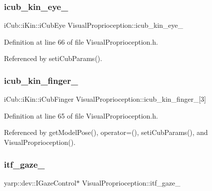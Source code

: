 \subsubsection{\texorpdfstring{icub\+\_\+kin\+\_\+eye\+\_\+}{icub\_kin\_eye\_}}
{\footnotesize\ttfamily i\+Cub\+::i\+Kin\+::i\+Cub\+Eye Visual\+Proprioception\+::icub\+\_\+kin\+\_\+eye\+\_\+\hspace{0.3cm}{\ttfamily [protected]}}



Definition at line 66 of file Visual\+Proprioception.\+h.



Referenced by seti\+Cub\+Params().

\mbox{\label{classVisualProprioception_a629e04a45391f571094e4ae8a8dedbff}} 
\subsubsection{\texorpdfstring{icub\+\_\+kin\+\_\+finger\+\_\+}{icub\_kin\_finger\_}}
{\footnotesize\ttfamily i\+Cub\+::i\+Kin\+::i\+Cub\+Finger Visual\+Proprioception\+::icub\+\_\+kin\+\_\+finger\+\_\+\mbox{[}3\mbox{]}\hspace{0.3cm}{\ttfamily [protected]}}



Definition at line 65 of file Visual\+Proprioception.\+h.



Referenced by get\+Model\+Pose(), operator=(), seti\+Cub\+Params(), and Visual\+Proprioception().

\mbox{\label{classVisualProprioception_a775bf77a04b5c23488e53a58b47d7e20}} 
\subsubsection{\texorpdfstring{itf\+\_\+gaze\+\_\+}{itf\_gaze\_}}
{\footnotesize\ttfamily yarp\+::dev\+::\+I\+Gaze\+Control$\ast$ Visual\+Proprioception\+::itf\+\_\+gaze\+\_\+\hspace{0.3cm}{\ttfamily [protected]}}



